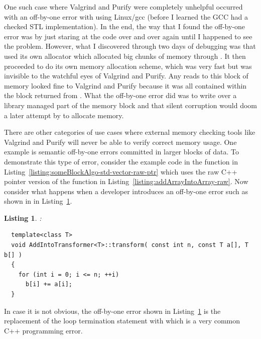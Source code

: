 \documentclass[pdf,ps2pdf,11pt]{SANDreport}
\newtheorem{listing}{Listing}
\begin{document}
One such case where Valgrind and Purify were completely unhelpful
occurred with an off-by-one error with {} using
Linux/gcc (before I learned the GCC had a checked STL implementation).
In the end, the way that I found the off-by-one error was by just
staring at the code over and over again until I happened to see the
problem.  However, what I discovered through two days of debugging was
that {} used its own allocator which allocated big
chunks of memory through {}.  It then proceeded to do
its own memory allocation scheme, which was very fast but was
invisible to the watchful eyes of Valgrind and Purify.  Any reads to
this block of memory looked fine to Valgrind and Purify because it was
all contained within the block returned from {}.
What the off-by-one error did was to write over a library managed part
of the memory block and that silent corruption would doom a later
attempt by {} to allocate memory.

There are other categories of use cases where external memory checking
tools like Valgrind and Purify will never be able to verify correct
memory usage.  One example is semantic off-by-one errors committed in
larger blocks of data.  To demonstrate this type of error, consider
the example code in the function {} in
Listing~\ref{listing:someBlockAlgo-std-vector-raw-ptr} which uses the
raw C++ pointer version of the function {} in
Listing~\ref{listing:addArrayIntoArray-raw}.  Now consider what
happens when a developer introduces an off-by-one error such as shown
in {} in
Listing~\ref{listing:addArrayIntoArray_rawError}.

\begin{listing}:\\
\label{listing:addArrayIntoArray_rawError}
{\small\begin{verbatim}
  template<class T>
  void AddIntoTransformer<T>::transform( const int n, const T a[], T b[] )
  {
    for (int i = 0; i <= n; ++i)
      b[i] += a[i];
  }
\end{verbatim}}
\end{listing}

In case it is not obvious, the off-by-one error shown in
Listing~\ref{listing:addArrayIntoArray_rawError} is the replacement of
the loop termination statement {} with {} which
is a very common C++ programming error.
\end{document}
